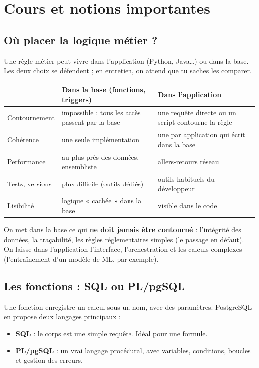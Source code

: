\section{Cours et notions importantes}

\subsection{Où placer la logique métier ?}

Une règle métier peut vivre dans l'application (Python, Java\dots) ou dans la base. Les deux choix se
défendent ; en entretien, on attend que tu saches les comparer.

\begin{center}\small
\begin{tabularx}{\linewidth}{@{}B{3.4cm} L L@{}}
\toprule
& Dans la base (fonctions, triggers) & Dans l'application \\
\midrule
Contournement & impossible : tous les accès passent par la base & une requête directe ou un script
contourne la règle \\
Cohérence & une seule implémentation & une par application qui écrit dans la base \\
Performance & au plus près des données, ensembliste & allers-retours réseau \\
Tests, versions & plus difficile (outils dédiés) & outils habituels du développeur \\
Lisibilité & logique « cachée » dans la base & visible dans le code \\
\bottomrule
\end{tabularx}
\end{center}

\begin{regle}
On met dans la base ce qui \textbf{ne doit jamais être contourné} : l'intégrité des données, la
traçabilité, les règles réglementaires simples (le passage en défaut). On laisse dans l'application
l'interface, l'orchestration et les calculs complexes (l'entraînement d'un modèle de ML, par exemple).
\end{regle}

\subsection{Les fonctions : SQL ou PL/pgSQL}

Une fonction enregistre un calcul sous un nom, avec des paramètres. PostgreSQL en propose deux
langages principaux :
\begin{itemize}
\item \textbf{SQL} : le corps est une simple requête. Idéal pour une formule.
\item \textbf{PL/pgSQL} : un vrai langage procédural, avec variables, conditions, boucles et gestion des
erreurs.
\end{itemize}

